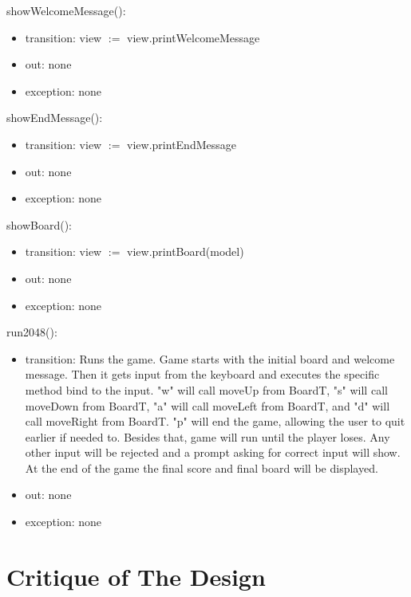 \documentclass[12pt]{article}
\begin{document}
\noindent showWelcomeMessage(): 
\begin{itemize}
    \item transition: view $:=$ view.printWelcomeMessage
    \item out: none
    \item exception: none
\end{itemize}

\noindent showEndMessage(): 
\begin{itemize}
    \item transition: view $:=$ view.printEndMessage
    \item out: none
    \item exception: none
\end{itemize}

\noindent showBoard(): 
\begin{itemize}
    \item transition: view $:=$ view.printBoard(model)
    \item out: none
    \item exception: none
\end{itemize}

\noindent run2048(): 
\begin{itemize}
    \item transition: Runs the game. Game starts with the initial board and welcome message. Then it gets input from the keyboard and executes the specific method bind to the input. "w" will call moveUp from BoardT, "s" will call moveDown from BoardT, "a" will call moveLeft from BoardT, and "d" will call moveRight from BoardT. "p" will end the game, allowing the user to quit earlier if needed to. Besides that, game will run until the player loses. Any other input will be rejected and a prompt asking for correct input will show. At the end of the game the final score and final board will be displayed.
    \item out: none
    \item exception: none
\end{itemize}


\newpage

\section* {Critique of The Design}
\end{document}
